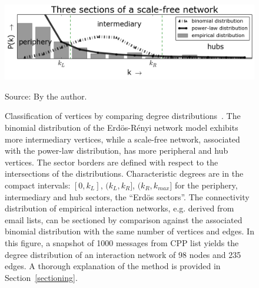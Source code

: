 \documentclass[review]{elsarticle}
\begin{document}
\clearpage
\begin{figure}[!h]
\centering
\includegraphics[width=\textwidth]{figs/fser__}
\caption{Classification of vertices by comparing degree
distributions~\cite{stab}.
The binomial distribution of the Erd\"os-R\'enyi network model exhibits more intermediary vertices, while a scale-free network, associated with the power-law distribution, has more peripheral and hub vertices. The sector borders are defined with respect to the intersections of the distributions. Characteristic degrees are in the compact intervals: $[0,k_L]$, $(k_L,k_R]$, $(k_R,k_{max}]$ for the periphery, intermediary and hub sectors, the ``Erd\"os sectors''.
The connectivity distribution of empirical interaction networks, e.g. derived from email lists, can be sectioned by comparison against the associated binomial distribution with the same number of vertices and edges. In this figure, a snapshot of 1000 messages from CPP list yields the degree distribution of an interaction network of 98 nodes and 235 edges. A thorough explanation of the method is provided in Section~\ref{sectioning}.}
\label{fig:setores}
\begin{flushleft}\footnotesize
Source: By the author.\
\end{flushleft}
\end{figure}
\end{document}
